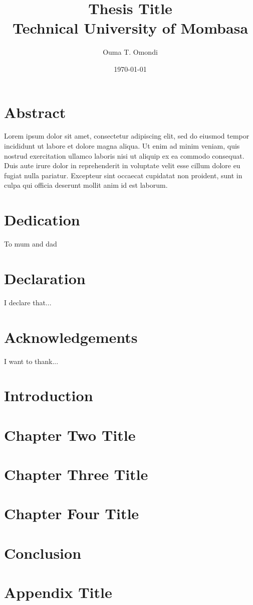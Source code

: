 \documentclass[12pt,twoside]{report}
\title{
	{Thesis Title}\\
	{\large Technical University of Mombasa}	
}
\author{Ouma T. Omondi}
\date{\today}
\begin{document}
\maketitle

\chapter*{Abstract}
Lorem ipsum dolor sit amet, consectetur adipiscing elit, sed do eiusmod tempor incididunt ut labore et dolore magna aliqua. Ut enim ad minim veniam, quis nostrud exercitation ullamco laboris nisi ut aliquip ex ea commodo consequat. Duis aute irure dolor in reprehenderit in voluptate velit esse cillum dolore eu fugiat nulla pariatur. Excepteur sint occaecat cupidatat non proident, sunt in culpa qui officia deserunt mollit anim id est laborum.

\chapter*{Dedication}
To mum and dad

\chapter*{Declaration}
I declare that...

\chapter*{Acknowledgements}
I want to thank...

\tableofcontents

\chapter{Introduction}

\chapter{Chapter Two Title}

\chapter{Chapter Three Title}

\chapter{Chapter Four Title}

\chapter{Conclusion}


\appendix
\chapter{Appendix Title}

\end{document}
